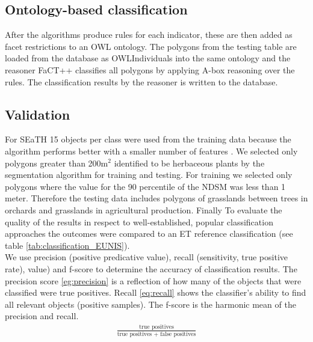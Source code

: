 \documentclass[authoryear, review,12pt,number]{elsarticle}
\begin{document}
\subsection{Ontology-based classification}
\label{subsec:Onto_classification}
After the algorithms produce rules for each indicator, these are then added as 
facet restrictions to an OWL ontology. The polygons from the testing table are 
loaded from the database as OWLIndividuals into the same ontology and the 
reasoner FaCT++ classifies all polygons by applying A-box reasoning over the 
rules. The classification results by the reasoner is written to the database. 
\subsection{Validation} 
\label{subsec:Validation}
For SEaTH 
15 objects per class were used from the training data because the algorithm 
performs better with a smaller number of features \citep{Nussbaum2006}. We 
selected only polygons greater than 200m$^{2}$ identified to be herbaceous 
plants by the segmentation algorithm for training and testing. For training we 
selected only polygons where the value for the 90 percentile of the NDSM was 
less than 1 meter. Therefore the testing data includes polygons of grasslands 
between trees in orchards and grasslands in agricultural production. Finally To 
evaluate the quality of the results in respect to well-established, popular 
classification approaches the outcomes were compared to an ET reference 
classification (see table \ref{tab:classification_EUNIS}).
\\
We use 
precision (positive predicative value), 
recall (sensitivity, true positive rate), 
value) and 
f-score to determine the accuracy of classification results. 
The precision score \ref{eg:precision} is a reflection of how many of the 
objects that were classified were true positives. Recall \ref{eq:recall} shows 
the classifier's ability to find all relevant objects (positive samples). The 
f-score is the harmonic mean of the precision and recall.
\begin{equation}
\begin{align*}
    \frac{\text{true positives}}{\text{true positives + false positives}}
\end{align*}
\label{eq:precision}
\end{equation}
\end{document}
